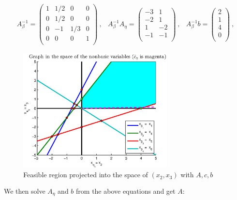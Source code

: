 \[
\begin{array}{ccc}
A_\beta^{-1}  =  \left(
  \begin{array}{cccc}
    1 & 1/2 & 0 & 0  \\
    0 & 1/2 & 0 & 0\\
    0 & -1 & 1/3 & 0\\
    0 & 0 & 0 & 1\\
  \end{array}
\right)~, &

A_\beta^{-1}A_\eta  =  \left(
  \begin{array}{cc}
    -3 & 1   \\
    -2 & 1 \\
    1 & -2\\
    -1 & -1 \\
  \end{array}
\right)~,&

A_\beta^{-1}b  =  \left(
  \begin{array}{c}
    2   \\
    1 \\
    4\\
    0\\
  \end{array}
\right)~,

\end{array}
\]

\begin{figure}[h!!]
\includegraphics[width=0.7\textwidth]{p2/new.eps}
\caption{Feasible region projected into the space of $(x_2,x_3)$ with $A,c,b$}\label{fig:p12}
\end{figure}

We then solve $A_\eta$ and $b$ from the above equations and get $A$:

